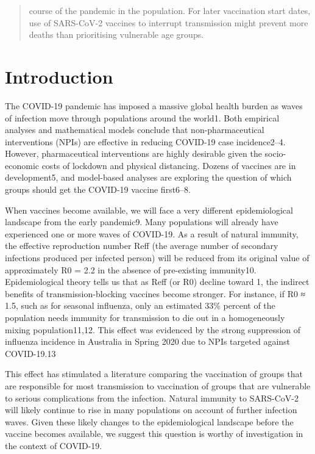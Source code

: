 \begin{abstract}
course of the pandemic in the population. For later vaccination start dates, use of SARS-CoV-2 vaccines to interrupt transmission might prevent more deaths than prioritising vulnerable age groups.

  
\end{abstract}


\section{Introduction}

The COVID-19 pandemic has imposed a massive global health burden as waves of infection move through populations around the world1.  Both empirical analyses and mathematical models conclude that non-pharmaceutical interventions (NPIs) are effective in reducing COVID-19 case incidence2–4.  However, pharmaceutical interventions are highly desirable given the socio-economic costs of lockdown and physical distancing. Dozens of vaccines are  in development5, and model-based analyses are exploring the question of which groups should get the COVID-19 vaccine first6–8.  

When vaccines become available, we will face a very different epidemiological landscape from the early pandemic9. Many populations will already have experienced one or more waves of COVID-19.  As a result of natural immunity, the effective reproduction number Reff (the average number of secondary infections produced per infected person) will be reduced from its original value of approximately R0 = 2.2 in the absence of pre-existing immunity10. Epidemiological theory tells us that as Reff (or R0) decline toward 1, the indirect benefits of transmission-blocking vaccines become stronger.  For instance, if R0 ≈ 1.5, such as for seasonal influenza, only an estimated 33\% percent of the population needs immunity for transmission to die out in a homogeneously mixing population11,12.  This effect was evidenced by the strong suppression of influenza incidence in Australia in Spring 2020 due to NPIs targeted against COVID-19.13

This effect has stimulated a literature comparing the vaccination of groups that are responsible for most transmission to vaccination of groups that are vulnerable to serious complications from the infection. Natural immunity to SARS-CoV-2 will likely continue to rise in many populations on account of further infection waves. Given these likely changes to the epidemiological landscape before the vaccine becomes available, we suggest this question is worthy of investigation in the context of COVID-19. 

